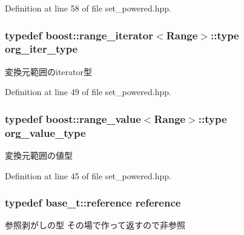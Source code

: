 \-Definition at line 58 of file set\-\_\-powered.\-hpp.

\hypertarget{classyuh_1_1range__detail_1_1set__power__iterator_a7d85ad9a5f85d7a869dd7ea9557eee8b}{
\subsubsection[{org\-\_\-iter\-\_\-type}]{\setlength{\rightskip}{0pt plus 5cm}typedef boost\-::range\-\_\-iterator$<$\-Range$>$\-::type {\bf org\-\_\-iter\-\_\-type}}}\label{db/d16/classyuh_1_1range__detail_1_1set__power__iterator_a7d85ad9a5f85d7a869dd7ea9557eee8b}
変換元範囲のiterator型 

\-Definition at line 49 of file set\-\_\-powered.\-hpp.

\hypertarget{classyuh_1_1range__detail_1_1set__power__iterator_a69559cacbf423e64c6efb8e1644ea37e}{
\subsubsection[{org\-\_\-value\-\_\-type}]{\setlength{\rightskip}{0pt plus 5cm}typedef boost\-::range\-\_\-value$<$\-Range$>$\-::type {\bf org\-\_\-value\-\_\-type}}}\label{db/d16/classyuh_1_1range__detail_1_1set__power__iterator_a69559cacbf423e64c6efb8e1644ea37e}
変換元範囲の値型 

\-Definition at line 45 of file set\-\_\-powered.\-hpp.

\hypertarget{classyuh_1_1range__detail_1_1set__power__iterator_aa5d67140d1557795cc6c30a2849d4e05}{
\subsubsection[{reference}]{\setlength{\rightskip}{0pt plus 5cm}typedef base\-\_\-t\-::reference {\bf reference}}}\label{db/d16/classyuh_1_1range__detail_1_1set__power__iterator_aa5d67140d1557795cc6c30a2849d4e05}
参照剥がしの型 その場で作って返すので非参照 

